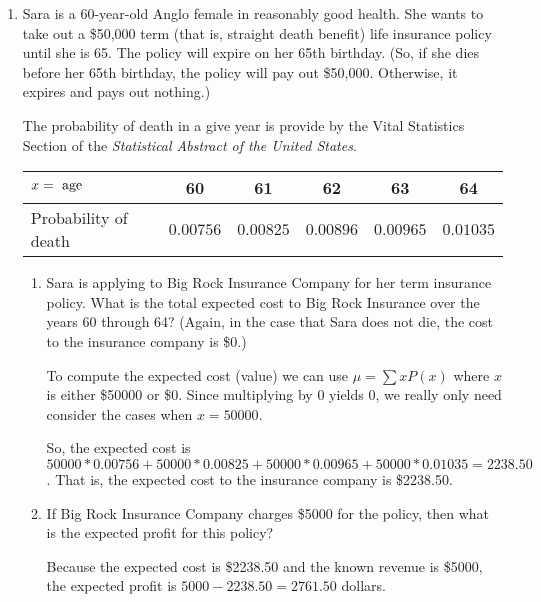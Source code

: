 \documentclass{article}
\newcommand{\answer}[1]{\color{white}#1}
\begin{document}
\begin{enumerate}
\item Sara is a 60-year-old Anglo female in reasonably good health.  She wants to take out a \$50,000 term (that is, straight death benefit) life insurance policy until she is 65.  The policy will expire on her 65th birthday.  (So, if she dies before her 65th birthday, the policy will pay out \$50,000.  Otherwise, it expires and pays out nothing.) 

The probability of death in a give year is provide by the Vital Statistics Section of the {\em Statistical Abstract of the United States}. 

\begin{tabular}{l||ccccc}
\hline
$x=\textnormal{ age }$ & 60 & 61 & 62 & 63 & 64 \\
\hline
Probability of death & $0.00756$ & $0.00825$ & $0.00896$ & $0.00965$ & $0.01035$ \\
\hline
\end{tabular}

	\begin{enumerate}
	\item Sara is applying to Big Rock Insurance Company for her term insurance policy.  What is the total expected cost to Big Rock Insurance over the years 60 through 64?  (Again, in the case that Sara does not die, the cost to the insurance company is \$0.) 
	
	{\answer To compute the expected cost (value) we can use $\mu = \sum xP(x)$ where $x$ is either \$50000 or \$0.  Since multiplying by $0$ yields $0$, we really only need consider the cases when $x = 50000$. 
	
	So, the expected cost is $50000*0.00756 + 50000*0.00825 + 50000*0.00965 + 50000*0.01035 = 2238.50$. That is, the expected cost to the insurance company is \$2238.50.}
	
	\item If Big Rock Insurance Company charges \$5000 for the policy, then what is the expected profit for this policy? 
	
	{\answer Because the expected cost is \$2238.50 and the known revenue is \$5000, the expected profit is $5000-2238.50 = 2761.50$ dollars. 
	}
	\end{enumerate}

	
\end{enumerate}
\end{document}
